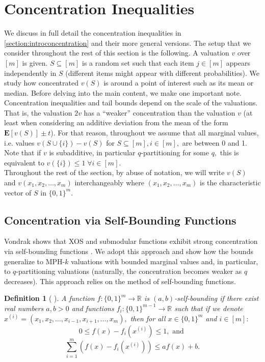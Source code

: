 \documentclass[11pt]{article}\usepackage{amsfonts}
\newtheorem{definition}[theorem]{Definition}
\numberwithin{theorem}{subsection}
\newcommand{\expect}{\mathbf{E}}
\begin{document}
\section{Concentration Inequalities}
\label{section:concentration}
We discuss in full detail the concentration inequalities in \cref{section:introconcentration} and their more general versions.  The setup that we consider throughout the rest of this section is the following.
A valuation $v$ over $[m]$ is given.
$S\subseteq [m]$ is a random set such that each item $j\in [m]$ appears independently in $S$ (different items might appear with different probabilities). We study how concentrated $v(S)$ is around a point of interest such as its mean or median.  
Before delving into the main content, we make one important note. Concentration inequalities and tail bounds depend on the scale of the valuations. That is, the valuation $2v$ has a ``weaker'' concentration than the valuation $v$ (at least when considering an additive deviation from the mean of the form $\expect[v(S)]\pm t$). For that reason, throughout we assume that all marginal values, i.e. values $v(S\cup\{i\}) - v(S)$ for $S\subseteq [m], i\in [m],$ are between 0 and 1. Note that if $v$ is subadditive, in particular $q$-partitioning for some $q,$ this is equivalent to $v(\{i\})\le 1\; \forall i\in [m]$.\\

\noindent
Throughout the rest of the section, by abuse of notation, we will write $v(S)$ and $v(x_1, x_2, \ldots, x_m)$ interchangeably where $(x_1, x_2, \ldots, x_m)$ is the characteristic vector of $S$ in $\{0,1\}^m.$

\subsection{Concentration via Self-Bounding Functions}
\label{section:selfbounding}
Vondrak shows that XOS and submodular functions exhibit strong concentration via self-bounding functions \cite[Corollary 3.2]{Vondrak10}. We adopt this approach and show how the bounds generalize to MPH-$k$ valuations with bounded marginal values and, in particular, to $q$-partitioning valuations (naturally, the concentration becomes weaker as $q$ decreases). This approach relies on the method of self-bounding functions.

\begin{definition}[{
\cite[Definition 2.3]{Vondrak10}}]
\label{def:selfboundingfunctions}
A function $f:\{0,1\}^m \longrightarrow \mathbb{R}$ is $(a,b)$-self-bounding if there exist real numbers $a,b>0$ and functions $f_i:\{0,1\}^{m-1}\longrightarrow \mathbb{R}$ such that if we denote\linebreak $x^{(i)} = (x_1, x_2, \ldots, x_{i-1}, x_{i+1}, \ldots, x_m),$ then for all $x\in \{0,1\}^m$ and $i\in [m]:$
$$
0\le f(x)-f_i(x^{(i)})\le 1, \text{ and }$$
$$
\sum_{i=1}^m (f(x) - f_i(x^{(i)}))\le 
af(x) + b. 
$$
\end{definition}
\end{document}
